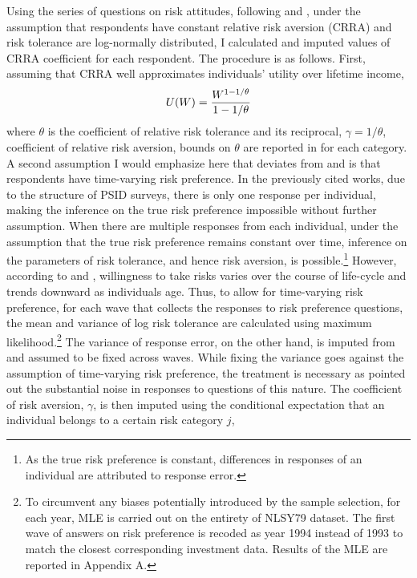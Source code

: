 \documentclass[]{article}
\begin{document}
Using the series of questions on risk attitudes, following \citet{kimball2008imputing} and \citet{kimball2009risk}, under the assumption that respondents have constant relative risk aversion (CRRA) and risk tolerance are log-normally distributed, I calculated and imputed values of CRRA coefficient for each respondent. The procedure is as follows. First, assuming that CRRA well approximates individuals' utility over lifetime income,
\[U(W)={W^{1-{1/\theta}}\over 1-{1/\theta}}\]
where $\theta$ is the coefficient of relative risk tolerance and its reciprocal, $\gamma = 1/\theta$, coefficient of relative risk aversion, bounds on $\theta$ are reported in  for each category. A second assumption I would emphasize here that deviates from \citet{kimball2008imputing} and \cite{kimball2009risk} is that respondents have time-varying risk preference. In the previously cited works, due to the structure of PSID surveys, there is only one response per individual, making the inference on the true risk preference impossible without further assumption. When there are multiple responses from each individual, under the assumption that the true risk preference remains constant over time, inference on the parameters of risk tolerance, and hence risk aversion, is possible.\footnote{As the true risk preference is constant, differences in responses of an individual are attributed to response error.} However, according to \citet{dohmen2011individual} and \citet{dohmen2017risk}, willingness to take risks varies over the course of life-cycle and trends downward as individuals age. Thus, to allow for time-varying risk preference, for each wave that collects the responses to risk preference questions, the mean and variance of log risk tolerance are calculated using maximum likelihood.\footnote{To circumvent any biases potentially introduced by the sample selection, for each year, MLE is carried out on the entirety of NLSY79 dataset. The first wave of answers on risk preference is recoded as year 1994 instead of 1993 to match the closest corresponding investment data. Results of the MLE are reported in Appendix A.} The variance of response error, on the other hand, is imputed from \cite{kimball2009risk} and assumed to be fixed across waves. While fixing the variance goes against the assumption of time-varying risk preference, the treatment is necessary as \citet{kimball2008imputing} pointed out the substantial noise in responses to questions of this nature. The coefficient of risk aversion, $\gamma$, is then imputed using the conditional expectation that an individual belongs to a certain risk category $j$,
\end{document}
